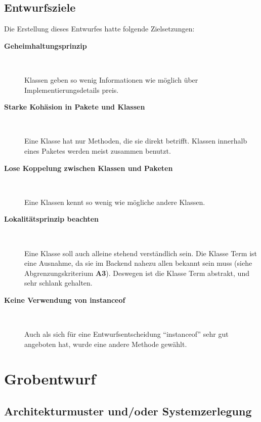 \documentclass[parskip=full,11pt,twoside]{scrbook}
\begin{document}
\subsection{Entwurfsziele}
Die Erstellung dieses Entwurfes hatte folgende Zielsetzungen:
\begin{description}
	
		\item[\textbf{Geheimhaltungsprinzip}] ~\par
			Klassen geben so wenig Informationen wie möglich über Implementierungsdetails preis.
			
		\item[\textbf{Starke Kohäsion in Pakete und Klassen}] ~\par
			Eine Klasse hat nur Methoden, die sie direkt betrifft. 
            Klassen innerhalb eines Paketes werden meist zusammen benutzt.
			
		\item[\textbf{Lose Koppelung zwischen Klassen und Paketen}]~\par
			Eine Klassen kennt so wenig wie mögliche andere Klassen.
			
		\item[\textbf{Lokalitätsprinzip beachten}] ~\par
			Eine Klasse soll auch alleine stehend verständlich sein.
            Die Klasse Term ist eine Ausnahme, da sie im Backend nahezu allen bekannt sein muss (siehe Abgrenzungskriterium \textbf{A3}).
            Deswegen ist die Klasse Term abstrakt, und sehr schlank gehalten.
			
		\item[\textbf{Keine Verwendung von instanceof}] ~\par
            Auch als sich für eine Entwurfsentscheidung \enquote{instanceof} sehr gut angeboten hat, wurde eine andere Methode gewählt.
	
\end{description}
\pagebreak

\section{Grobentwurf}
\subsection{Architekturmuster und/oder Systemzerlegung}
\end{document}
